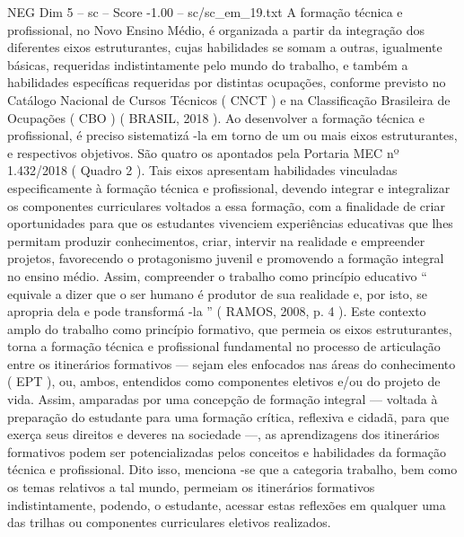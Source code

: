 \begin{textsample}{NEG Dim 5 – sc – Score -1.00 – sc/sc\_em\_19.txt}
A formação técnica e profissional, no Novo Ensino Médio, é organizada a partir da integração dos diferentes eixos estruturantes, cujas habilidades se somam a outras, igualmente básicas, requeridas indistintamente pelo mundo do trabalho, e também a habilidades específicas requeridas por distintas ocupações, conforme previsto no Catálogo Nacional de Cursos Técnicos ( CNCT ) e na Classificação Brasileira de Ocupações ( CBO ) ( BRASIL, 2018 ).
Ao desenvolver a formação técnica e profissional, é preciso sistematizá -la em torno de um ou mais eixos estruturantes, e respectivos objetivos.
São quatro os apontados pela Portaria MEC nº 1.432/2018 ( Quadro 2 ).
Tais eixos apresentam habilidades vinculadas especificamente à formação técnica e profissional, devendo integrar e integralizar os componentes curriculares voltados a essa formação, com a finalidade de criar oportunidades para que os estudantes vivenciem experiências educativas que lhes permitam produzir conhecimentos, criar, intervir na realidade e empreender projetos, favorecendo o protagonismo juvenil e promovendo a formação integral no ensino médio.
Assim, compreender o trabalho como princípio educativo “ equivale a dizer que o ser humano é produtor de sua realidade e, por isto, se apropria dela e pode transformá -la ” ( RAMOS, 2008, p. 4 ).
Este contexto amplo do trabalho como princípio formativo, que permeia os eixos estruturantes, torna a formação técnica e profissional fundamental no processo de articulação entre os itinerários formativos — sejam eles enfocados nas áreas do conhecimento ( EPT ), ou, ambos, entendidos como componentes eletivos e/ou do projeto de vida.
Assim, amparadas por uma concepção de formação integral — voltada à preparação do estudante para uma formação crítica, reflexiva e cidadã, para que exerça seus direitos e deveres na sociedade —, as aprendizagens dos itinerários formativos podem ser potencializadas pelos conceitos e habilidades da formação técnica e profissional.
Dito isso, menciona -se que a categoria trabalho, bem como os temas relativos a tal mundo, permeiam os itinerários formativos indistintamente, podendo, o estudante, acessar estas reflexões em qualquer uma das trilhas ou componentes curriculares eletivos realizados.

\end{textsample}
